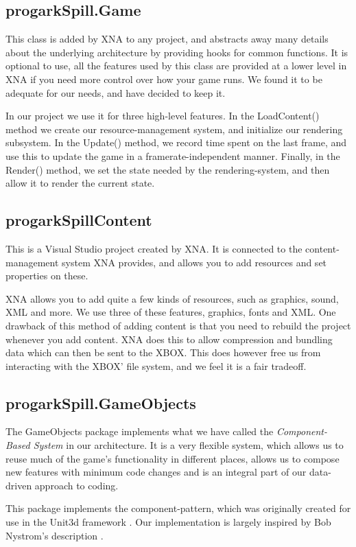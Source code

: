\subsection{progarkSpill.Game}
This class is added by XNA to any project, and abstracts away many details
about the underlying architecture by providing hooks for common functions.
It is optional to use, all the features used by this class are provided at
a lower level in XNA if you need more control over how your game runs. We
found it to be adequate for our needs, and have decided to keep it.

In our project we use it for three high-level features. In the LoadContent()
method we create our resource-management system, and initialize our rendering
subsystem.  In the Update() method, we record time spent on the last frame, and
use this to update the game in a framerate-independent manner. Finally, in the
Render() method, we set the state needed by the rendering-system, and then
allow it to render the current state.

\subsection{progarkSpillContent}
This is a Visual Studio project created by XNA.  It is connected to the
content-management system XNA provides, and allows you to add resources and set
properties on these.

XNA allows you to add quite a few kinds of resources, such as graphics, sound, 
XML and more. We use three of these features, graphics, fonts and XML. One
drawback of this method of adding content is that you need to rebuild the
project whenever you add content. XNA does this to allow compression and 
bundling data which can then be sent to the XBOX. This does however free us
from interacting with the XBOX' file system, and we feel it is a fair tradeoff.

\subsection{progarkSpill.GameObjects}
The GameObjects package implements what we have called the 
\emph{Component-Based System} in our architecture. It is a very flexible 
system, which allows
us to reuse much of the game's functionality in different places, allows us
to compose new features with minimum code changes and is an integral part of
our data-driven approach to coding.

This package implements the component-pattern, which was originally created
for use in the Unit3d framework \cite{unity}. Our implementation is largely
inspired by Bob Nystrom's description \cite{component}.

